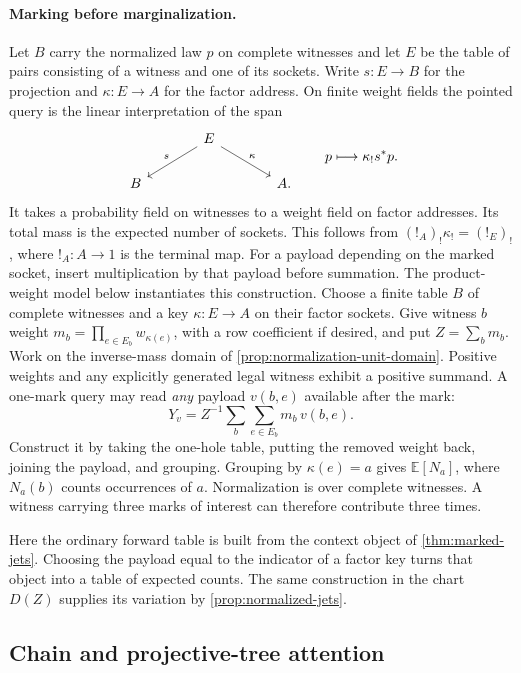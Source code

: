 \documentclass[11pt,a4paper]{article}
\theoremstyle{definition}
\theoremstyle{remark}\newaliascnt{remark}{theorem}
\numberwithin{equation}{section}
\begin{document}
\paragraph{Marking before marginalization.}
Let \(B\) carry the normalized law \(p\) on complete witnesses and let \(E\) be the table of pairs consisting of a witness and one of its sockets. Write \(s:E\to B\) for the projection and \(\kappa:E\to A\) for the factor address. On finite weight fields the pointed query is the linear interpretation of the span
\[
\begin{tikzcd}[column sep=large]
 &E\arrow[dl,"s"']\arrow[dr,"\kappa"]\\
 B&&A .
\end{tikzcd}
\qquad
 p\longmapsto \kappa_!s^*p .
\]
It takes a probability field on witnesses to a weight field on factor addresses. Its total mass is the expected number of sockets. This follows from \((!_A)_!\kappa_!=(!_E)_!\), where \(!_A:A\to1\) is the terminal map. For a payload depending on the marked socket, insert multiplication by that payload before summation. The product-weight model below instantiates this construction.
Choose a finite table $B$ of complete witnesses and a key $\kappa:E\to A$ on their factor sockets. Give witness $b$ weight $m_b=\prod_{e\in E_b}w_{\kappa(e)}$, with a row coefficient if desired, and put $Z=\sum_b m_b$. Work on the inverse-mass domain of \cref{prop:normalization-unit-domain}. Positive weights and any explicitly generated legal witness exhibit a positive summand. A one-mark query may read \emph{any} payload $v(b,e)$ available after the mark:
\[
     Y_v=Z^{-1}\sum_b\sum_{e\in E_b}m_b\,v(b,e).
\]
Construct it by taking the one-hole table, putting the removed weight back, joining the payload, and grouping. Grouping by $\kappa(e)=a$ gives $\mathbb E[N_a]$, where $N_a(b)$ counts occurrences of $a$. Normalization is over complete witnesses. A witness carrying three marks of interest can therefore contribute three times.

Here the ordinary forward table is built from the context object of \cref{thm:marked-jets}. Choosing the payload equal to the indicator of a factor key turns that object into a table of expected counts. The same construction in the chart $D(Z)$ supplies its variation by \cref{prop:normalized-jets}.

\subsection{Chain and projective-tree attention}
\end{document}
